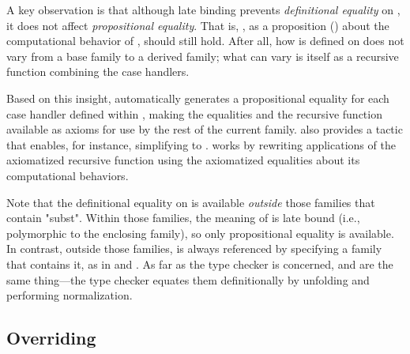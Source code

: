A key observation is that although late binding
prevents \emph{definitional equality} on , it does not
affect \emph{propositional equality}.
That is, ,
as a proposition () about the computational behavior of ,
should still hold.
After all, how  is defined on  does not vary
from a base family to a derived family;
what can vary is  itself as a recursive function combining the case handlers.

Based on this insight, \Lang automatically generates
a propositional equality for each case handler defined within ,
making the equalities and the recursive function available as axioms for use by the rest of the current family.
\Lang also provides a tactic  that enables, for instance,
simplifying  to .
 works by rewriting applications of the
axiomatized recursive function using the axiomatized equalities about its computational behaviors.

Note that the definitional equality on  is available
\emph{outside} those families that contain "subst".
Within those families, the meaning of  is late bound
(i.e., polymorphic to the enclosing family), so only
propositional equality is available.
In contrast, outside those families,  is always referenced
by specifying a family that contains it, %
as in  and .
As far as the type checker is concerned,  and
 are the same thing---the type checker
equates them definitionally by unfolding  and
performing normalization.


\subsection{Overriding}
\label{sec:override}

